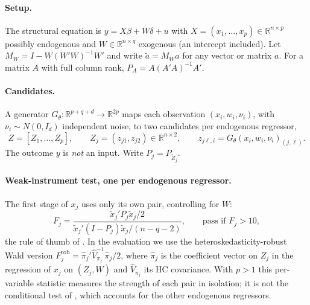 \documentclass[11pt]{article}
\theoremstyle{definition}
\theoremstyle{remark}
\begin{document}
\paragraph{Setup.} The structural equation is $y = X\beta + W\delta + u$ with
$X=(x_1,\dots,x_p)\in\mathbb{R}^{n\times p}$ possibly endogenous and $W\in\mathbb{R}^{n\times q}$
exogenous (an intercept included). Let $M_W = I - W(W'W)^{-1}W'$ and write $\tilde a = M_W a$ for any
vector or matrix $a$. For a matrix $A$ with full column rank, $P_A = A(A'A)^{-1}A'$.

\paragraph{Candidates.} A generator $G_\theta:\mathbb{R}^{p+q+d}\to\mathbb{R}^{2p}$ maps each observation
$(x_i,w_i,\nu_i)$, with $\nu_i\sim N(0,I_d)$ independent noise, to two candidates per endogenous
regressor,
\begin{equation}\label{eq:gan-candidates}
  Z = [Z_1,\dots,Z_p],\qquad Z_j = (z_{j1}, z_{j2}) \in\mathbb{R}^{n\times 2},\qquad
  z_{j\ell,i} = G_\theta(x_i,w_i,\nu_i)_{(j,\ell)} .
\end{equation}
The outcome $y$ is \emph{not} an input. Write $P_j = P_{\tilde Z_j}$.

\paragraph{Weak-instrument test, one per endogenous regressor.} The first stage of $x_j$ uses only
its own pair, controlling for $W$:
\begin{equation}\label{eq:gan-F}
  F_j = \frac{\tilde x_j'P_j\tilde x_j/2}{\tilde x_j'(I-P_j)\tilde x_j/(n-q-2)} ,
  \qquad \text{pass if } F_j > 10 ,
\end{equation}
the rule of thumb of \citet{stockyogo2005}. In the evaluation we use the heteroskedasticity-robust
Wald version $F_j^{\mathrm{rob}} = \hat\pi_j'\hat V_{\pi_j}^{-1}\hat\pi_j/2$, where $\hat\pi_j$ is the
coefficient vector on $Z_j$ in the regression of $x_j$ on $(Z_j,W)$ and $\hat V_{\pi_j}$ its HC
covariance. With $p>1$ this per-variable statistic measures the strength of each pair in isolation;
it is not the conditional test of \citet{sanderson2016}, which accounts for the other endogenous
regressors.
\end{document}
